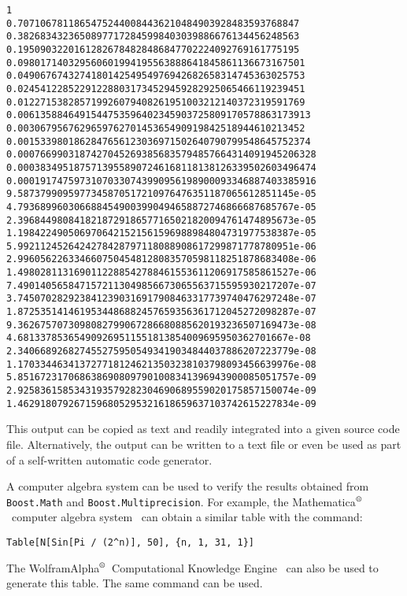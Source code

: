 \documentclass{article}[10pt]
\def\trademarksymbolr   {$^{\text{\rm{\scriptsize{\textregistered}}}}$}
\def\mathematica        {{Mathematica\trademarksymbolr}}
\def\wolframalpha       {{WolframAlpha\trademarksymbolr}}
\begin{document}
\begin{lstlisting}
1
0.70710678118654752440084436210484903928483593768847
0.38268343236508977172845998403039886676134456248563
0.19509032201612826784828486847702224092769161775195
0.098017140329560601994195563888641845861136673167501
0.049067674327418014254954976942682658314745363025753
0.024541228522912288031734529459282925065466119239451
0.012271538285719926079408261951003212140372319591769
0.0061358846491544753596402345903725809170578863173913
0.003067956762965976270145365490919842518944610213452
0.0015339801862847656123036971502640790799548645752374
0.00076699031874270452693856835794857664314091945206328
0.00038349518757139558907246168118138126339502603496474
0.00019174759731070330743990956198900093346887403385916
9.5873799095977345870517210976476351187065612851145e-05
4.7936899603066884549003990494658872746866687685767e-05
2.3968449808418218729186577165021820094761474895673e-05
1.1984224905069706421521561596988984804731977538387e-05
5.9921124526424278428797118088908617299871778780951e-06
2.9960562263346607504548128083570598118251878683408e-06
1.4980281131690112288542788461553611206917585861527e-06
7.4901405658471572113049856673065563715595930217207e-07
3.7450702829238412390316917908463317739740476297248e-07
1.8725351414619534486882457659356361712045272098287e-07
9.3626757073098082799067286680885620193236507169473e-08
4.681337853654909269511551813854009695950362701667e-08
2.3406689268274552759505493419034844037886207223779e-08
1.1703344634137277181246213503238103798093456639976e-08
5.8516723170686386908097901008341396943900085051757e-09
2.9258361585343193579282304690689559020175857150074e-09
1.4629180792671596805295321618659637103742615227834e-09
\end{lstlisting}

This output can be copied
as text and readily integrated into a given source code file.
Alternatively, the output can be written to a text file or
even be used as part of a self-written automatic code generator.

A computer algebra system can be used to verify
the results obtained from
\lstinline|Boost.Math| and \lstinline|Boost.Multiprecision|.
For example, the \mathematica\
computer algebra system~\cite{bibitem:mathematica}
can obtain a similar table with the command:

\begin{verbatim}
Table[N[Sin[Pi / (2^n)], 50], {n, 1, 31, 1}]
\end{verbatim}

The \wolframalpha\
Computational Knowledge Engine~\cite{bibitem:wolframalpha}
can also be used to generate this table.
The same command can be used.
\end{document}
